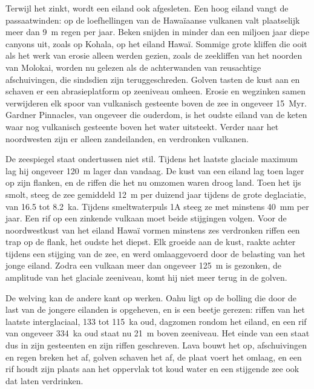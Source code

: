 Terwijl het zinkt, wordt een eiland ook afgesleten. Een hoog eiland vangt de passaatwinden: op de
loefhellingen van de Hawaïaanse vulkanen valt plaatselijk meer dan \qty{9}{m} regen per jaar.
Beken snijden in minder dan een miljoen jaar diepe canyons uit, zoals op Kohala, op het eiland Hawaï.
Sommige grote kliffen die ooit als het werk van erosie alleen werden gezien, zoals de zeekliffen van het noorden van
Molokai, worden nu gelezen als de achterwanden van reusachtige afschuivingen, die sindsdien zijn teruggeschreden. Golven tasten de kust aan en
schaven er een abrasieplatform op zeeniveau omheen. Erosie en wegzinken samen verwijderen elk spoor
van vulkanisch gesteente boven de zee in ongeveer \qty{15}{Myr}. Gardner Pinnacles, van ongeveer die ouderdom, is
het oudste eiland van de keten waar nog vulkanisch gesteente boven het water uitsteekt. Verder naar het
noordwesten zijn er alleen zandeilanden,  en verdronken vulkanen.

De zeespiegel staat ondertussen niet stil. Tijdens het laatste glaciale maximum lag hij ongeveer
\qty{120}{m} lager dan vandaag. De kust van een eiland lag toen lager op zijn flanken, en de riffen
die het nu omzomen waren droog land. Toen het ijs smolt, steeg de zee gemiddeld \qty{12}{m}
per duizend jaar tijdens de grote deglaciatie, van 16.5 tot \qty{8.2}{ka}. Tijdens
smeltwaterpuls 1A steeg ze met minstens \qty{40}{mm} per jaar. Een rif op een zinkende vulkaan moet beide
stijgingen volgen. Voor de noordwestkust van het eiland Hawaï vormen minstens zes verdronken riffen een
trap op de flank, het oudste het diepst. Elk groeide aan de kust, raakte achter tijdens een stijging
van de zee, en werd omlaaggevoerd door de belasting van het jonge eiland. Zodra een vulkaan meer dan
ongeveer \qty{125}{m} is gezonken, de amplitude van het glaciale zeeniveau, komt hij niet meer terug in de golven.

De welving kan de andere kant op werken. Oahu ligt op de bolling die door de last van de jongere eilanden is opgeheven,
en is een beetje gerezen: riffen van het laatste interglaciaal, 133 tot \qty{115}{ka} oud, dagzomen rondom
het eiland, en een rif van ongeveer \qty{334}{ka} oud staat nu \qty{21}{m} boven zeeniveau. Het
einde van een  staat dus in zijn gesteenten en zijn riffen geschreven. Lava bouwt het op, afschuivingen en
regen breken het af, golven schaven het af, de plaat voert het omlaag, en een rif houdt zijn plaats aan het
oppervlak tot koud water en een stijgende zee ook dat laten verdrinken.

